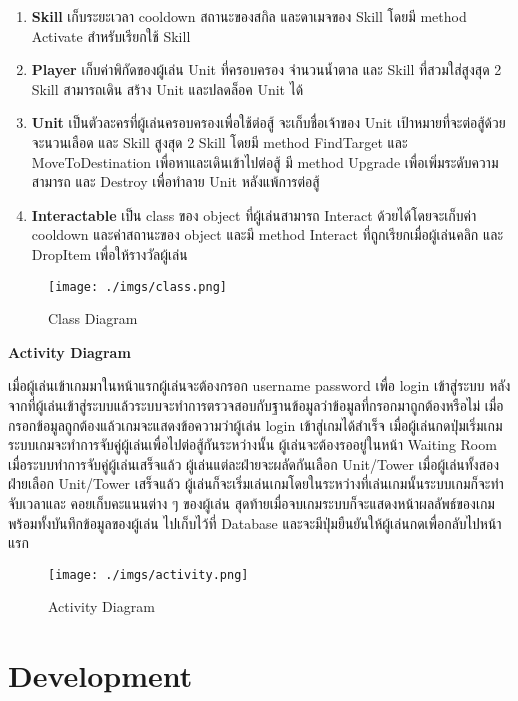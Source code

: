\documentclass[12pt,oneside,openright,a4paper]{cpe-thai-project}
\begin{document}
\begin{enumerate}
  \item \textbf{Skill} เก็บระยะเวลา cooldown สถานะของสกิล และดาเมจของ Skill 
  โดยมี method Activate สำหรับเรียกใช้ Skill
  \item \textbf{Player} เก็บค่าพิกัดของผู้เล่น Unit ที่ครอบครอง จำนวนน้ำตาล และ Skill 
  ที่สวมใส่สูงสุด 2 Skill สามารถเดิน สร้าง Unit และปลดล็อค Unit ได้
  \item \textbf{Unit} เป็นตัวละครที่ผู้เล่นครอบครองเพื่อใช้ต่อสู้ จะเก็บชื่อเจ้าของ Unit 
  เป้าหมายที่จะต่อสู้ด้วย จะนวนเลือด และ Skill สูงสุด 2 Skill โดยมี method FindTarget และ MoveToDestination เพื่อหาและเดินเข้าไปต่อสู้ มี method Upgrade เพื่อเพิ่มระดับความสามารถ และ Destroy เพื่อทำลาย Unit หลังแพ้การต่อสู้
  \item \textbf{Interactable} เป็น class ของ object ที่ผู้เล่นสามารถ Interact 
  ด้วยได้โดยจะเก็บค่า cooldown และค่าสถานะของ object และมี method Interact ที่ถูกเรียกเมื่อผู้เล่นคลิก และ DropItem เพื่อให้รางวัลผู้เล่น
\end{enumerate}

\begin{figure}[H]\centering
  \texttt{[image: ./imgs/class.png]}
  \caption{Class Diagram}\label{fig:class}
\end{figure}

\pagebreak
\textbf{Activity Diagram}

เมื่อผู้เล่นเข้าเกมมาในหน้าแรกผู้เล่นจะต้องกรอก username password เพื่อ login 
เข้าสู่ระบบ หลังจากที่ผู้เล่นเข้าสู่ระบบแล้วระบบจะทำการตรวจสอบกับฐานข้อมูลว่าข้อมูลที่กรอกมาถูกต้องหรือไม่ 
เมื่อกรอกข้อมูลถูกต้องแล้วเกมจะแสดงข้อความว่าผู้เล่น login เข้าสู่เกมได้สำเร็จ เมื่อผู้เล่นกดปุ่มเริ่มเกม 
ระบบเกมจะทำการจับคู่ผู้เล่นเพื่อไปต่อสู้กันระหว่างนั้น ผู้เล่นจะต้องรออยู่ในหน้า Waiting Room 
เมื่อระบบทำการจับคู่ผู้เล่นเสร็จแล้ว ผู้เล่นแต่ละฝ่ายจะผลัดกันเลือก Unit/Tower เมื่อผู้เล่นทั้งสองฝ่ายเลือก 
Unit/Tower เสร็จแล้ว ผู้เล่นก็จะเริ่มเล่นเกมโดยในระหว่างที่เล่นเกมนั้นระบบเกมก็จะทำจับเวลาและ
คอยเก็บคะแนนต่าง ๆ ของผู้เล่น สุดท้ายเมื่อจบเกมระบบก็จะแสดงหน้าผลลัพธ์ของเกมพร้อมทั้งบันทึกข้อมูลของผู้เล่น
ไปเก็บไว้ที่ Database และจะมีปุ่มยืนยันให้ผู้เล่นกดเพื่อกลับไปหน้าแรก

\begin{figure}[H]\centering
  \texttt{[image: ./imgs/activity.png]}
  \caption{Activity Diagram}\label{fig:activity}
\end{figure}

\section{Development}
\end{document}
